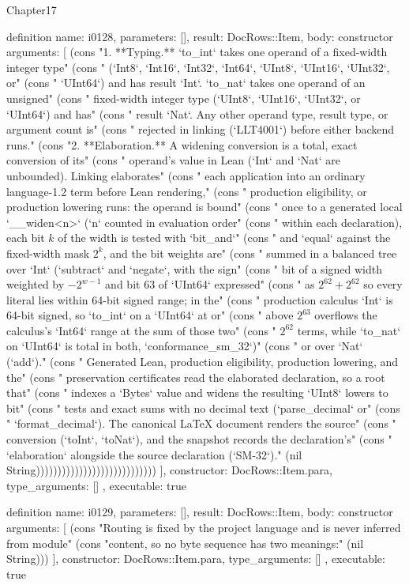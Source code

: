 \begin{lexlean}{Chapter17}
\begin{semanticmodule}
definition{
  name: i0128,
  parameters: [],
  result: DocRows::Item,
  body: constructor{
    arguments: [
      (cons "1. **Typing.** `to_int` takes one operand of a fixed-width integer type" (cons "   (`Int8`, `Int16`, `Int32`, `Int64`, `UInt8`, `UInt16`, `UInt32`, or" (cons "   `UInt64`) and has result `Int`. `to_nat` takes one operand of an unsigned" (cons "   fixed-width integer type (`UInt8`, `UInt16`, `UInt32`, or `UInt64`) and has" (cons "   result `Nat`. Any other operand type, result type, or argument count is" (cons "   rejected in linking (`LLT4001`) before either backend runs." (cons "2. **Elaboration.** A widening conversion is a total, exact conversion of its" (cons "   operand's value in Lean (`Int` and `Nat` are unbounded). Linking elaborates" (cons "   each application into an ordinary language-1.2 term before Lean rendering," (cons "   production eligibility, or production lowering runs: the operand is bound" (cons "   once to a generated local `__widen<n>` (`n` counted in evaluation order" (cons "   within each declaration), each bit $k$ of the width is tested with `bit_and`" (cons "   and `equal` against the fixed-width mask $2^k$, and the bit weights are" (cons "   summed in a balanced tree over `Int` (`subtract` and `negate`, with the sign" (cons "   bit of a signed width weighted by $-2^{w-1}$ and bit 63 of `UInt64` expressed" (cons "   as $2^{62} + 2^{62}$ so every literal lies within 64-bit signed range; in the" (cons "   production calculus `Int` is 64-bit signed, so `to_int` on a `UInt64` at or" (cons "   above $2^{63}$ overflows the calculus's `Int64` range at the sum of those two" (cons "   $2^{62}$ terms, while `to_nat` on `UInt64` is total in both, `conformance_sm_32`)" (cons "   or over `Nat` (`add`)." (cons "   Generated Lean, production eligibility, production lowering, and the" (cons "   preservation certificates read the elaborated declaration, so a root that" (cons "   indexes a `Bytes` value and widens the resulting `UInt8` lowers to bit" (cons "   tests and exact sums with no decimal text (`parse_decimal` or" (cons "   `format_decimal`). The canonical LaTeX document renders the source" (cons "   conversion (`toInt`, `toNat`), and the snapshot records the declaration's" (cons "   `elaboration` alongside the source declaration (`SM-32`)." (nil String))))))))))))))))))))))))))))
    ],
    constructor: DocRows::Item.para,
    type_arguments: []
  },
  executable: true
}

definition{
  name: i0129,
  parameters: [],
  result: DocRows::Item,
  body: constructor{
    arguments: [
      (cons "Routing is fixed by the project language and is never inferred from module" (cons "content, so no byte sequence has two meanings:" (nil String)))
    ],
    constructor: DocRows::Item.para,
    type_arguments: []
  },
  executable: true
}


\end{semanticmodule}
\end{lexlean}
